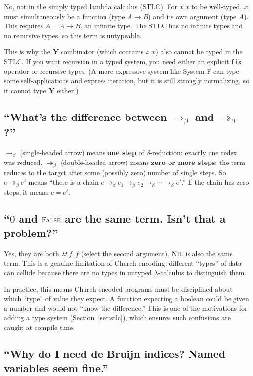 \documentclass[11pt,a4paper]{article}
\theoremstyle{definition}
\newcommand{\lam}{\lambda}
\newcommand{\reduce}{\longrightarrow_\beta}
\newcommand{\reduces}{\twoheadrightarrow_\beta}
\newcommand{\church}[1]{\overline{#1}}
\newcommand{\FL}{\textsc{False}}
\begin{document}
No, not in the simply typed lambda calculus (STLC). For $x\;x$ to be
well-typed, $x$ must simultaneously be a function (type $A \to B$) and its own
argument (type $A$). This requires $A = A \to B$, an infinite type. The STLC
has no infinite types and no recursive types, so this term is untypeable.

This is why the $\mathbf{Y}$ combinator (which contains $x\;x$) also cannot be
typed in the STLC. If you want recursion in a typed system, you need either
an explicit \texttt{fix} operator or recursive types. (A more expressive
system like System F can type some self-applications and express iteration,
but it is still strongly normalizing, so it cannot type $\mathbf{Y}$ either.)

\subsection{``What's the difference between $\reduce$ and $\reduces$?''}

$\reduce$ (single-headed arrow) means \textbf{one step} of $\beta$-reduction:
exactly one redex was reduced. $\reduces$ (double-headed arrow) means
\textbf{zero or more steps}: the term reduces to the target after some
(possibly zero) number of single steps. So $e \reduces e'$ means ``there is a
chain $e \reduce e_1 \reduce e_2 \reduce \cdots \reduce e'$.'' If the chain
has zero steps, it means $e = e'$.

\subsection{``$\church{0}$ and $\FL$ are the same term. Isn't that a problem?''}

Yes, they are both $\lam t\, f.\, f$ (select the second argument).
$\textsc{Nil}$ is also the same term. This is a genuine limitation of Church
encoding: different ``types'' of data can collide because there are no types in
untyped $\lam$-calculus to distinguish them.

In practice, this means Church-encoded programs must be disciplined about which
``type'' of value they expect. A function expecting a boolean could be given a
number and would not ``know the difference.'' This is one of the motivations for
adding a type system (Section~\ref{sec:stlc}), which ensures such confusions
are caught at compile time.

\subsection{``Why do I need de Bruijn indices? Named variables seem fine.''}
\end{document}
